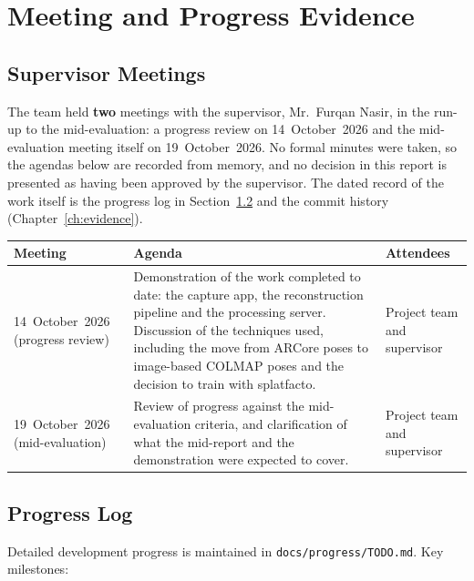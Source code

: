 \chapter{Meeting and Progress Evidence}

\section{Supervisor Meetings}

The team held \textbf{two} meetings with the supervisor, Mr.~Furqan Nasir, in the run-up to the mid-evaluation: a progress review on 14~October~2026 and the mid-evaluation meeting itself on 19~October~2026. No formal minutes were taken, so the agendas below are recorded from memory, and no decision in this report is presented as having been approved by the supervisor. The dated record of the work itself is the progress log in Section~\ref{sec:progresslog} and the commit history (Chapter~\ref{ch:evidence}).

\begin{longtable}{p{}p{}p{}}
\toprule
\textbf{Meeting} & \textbf{Agenda} & \textbf{Attendees} \\
\midrule
\endhead
14~October~2026 \newline (progress review) & Demonstration of the work completed to date: the capture app, the reconstruction pipeline and the processing server. Discussion of the techniques used, including the move from ARCore poses to image-based COLMAP poses and the decision to train with splatfacto. & Project team and supervisor \\
\midrule
19~October~2026 \newline (mid-evaluation) & Review of progress against the mid-evaluation criteria, and clarification of what the mid-report and the demonstration were expected to cover. & Project team and supervisor \\
\bottomrule
\end{longtable}

\section{Progress Log}
\label{sec:progresslog}

Detailed development progress is maintained in \texttt{docs/progress/TODO.md}. Key milestones:

